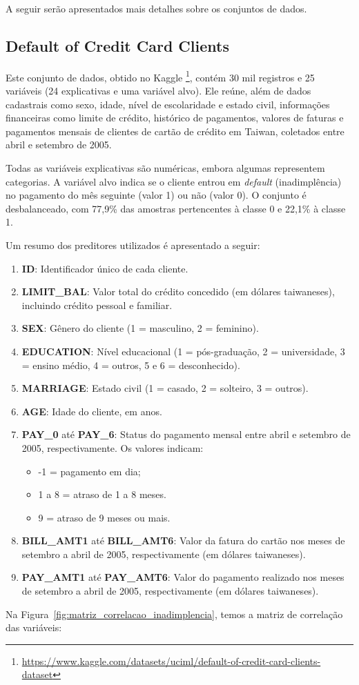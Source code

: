 A seguir serão apresentados mais detalhes sobre os conjuntos de dados.

\subsection{Default of Credit Card Clients}

Este conjunto de dados, obtido no Kaggle \footnote{\url{https://www.kaggle.com/datasets/uciml/default-of-credit-card-clients-dataset}}, contém 30 mil registros e 25 variáveis (24 explicativas e uma variável alvo). Ele reúne, além de dados cadastrais como sexo, idade, nível de escolaridade e estado civil, informações financeiras como limite de crédito, histórico de pagamentos, valores de faturas e pagamentos mensais de clientes de cartão de crédito em Taiwan, coletados entre abril e setembro de 2005.

Todas as variáveis explicativas são numéricas, embora algumas representem categorias. A variável alvo indica se o cliente entrou em \textit{default} (inadimplência) no pagamento do mês seguinte (valor 1) ou não (valor 0). O conjunto é desbalanceado, com 77,9\% das amostras pertencentes à classe 0 e 22,1\% à classe 1.

Um resumo dos preditores utilizados é apresentado a seguir:

\begin{enumerate}
    \item \textbf{ID}: Identificador único de cada cliente.
    \item \textbf{LIMIT\_BAL}: Valor total do crédito concedido (em dólares taiwaneses), incluindo crédito pessoal e familiar.
    \item \textbf{SEX}: Gênero do cliente (1 = masculino, 2 = feminino).
    \item \textbf{EDUCATION}: Nível educacional (1 = pós-graduação, 2 = universidade, 3 = ensino médio, 4 = outros, 5 e 6 = desconhecido).
    \item \textbf{MARRIAGE}: Estado civil (1 = casado, 2 = solteiro, 3 = outros).
    \item \textbf{AGE}: Idade do cliente, em anos.
    \item \textbf{PAY\_0} até \textbf{PAY\_6}: Status do pagamento mensal entre abril e setembro de 2005, respectivamente. Os valores indicam:
    \begin{itemize}
        \item -1 = pagamento em dia;
        \item 1 a 8 = atraso de 1 a 8 meses.
        \item 9 = atraso de 9 meses ou mais.
    \end{itemize}
    \item \textbf{BILL\_AMT1} até \textbf{BILL\_AMT6}: Valor da fatura do cartão nos meses de setembro a abril de 2005, respectivamente (em dólares taiwaneses).
    \item \textbf{PAY\_AMT1} até \textbf{PAY\_AMT6}: Valor do pagamento realizado nos meses de setembro a abril de 2005, respectivamente (em dólares taiwaneses).
\end{enumerate}
Na Figura~\ref{fig:matriz_correlacao_inadimplencia}, temos a matriz de correlação das variáveis:


